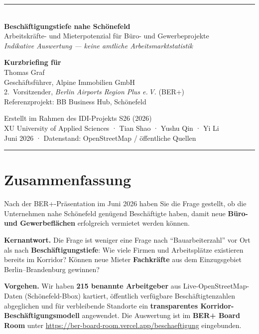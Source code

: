 \documentclass[11pt,a4paper,ngerman]{scrartcl}
\newcommand{\berhub}{\textbf{BER+ Board Room}}
\newcommand{\indikativ}{\textit{Indikative Auswertung — keine amtliche Arbeitsmarktstatistik}}
\begin{document}
\begin{titlepage}
  \centering
  \vspace*{1.2cm}
  {\color{berblue}\rule{\linewidth}{1.2pt}}\\[0.8em]
  {\LARGE\bfseries Beschäftigungstiefe nahe Schönefeld}\\[0.35em]
  {\large Arbeitskräfte- und Mieterpotenzial für Büro- und Gewerbeprojekte}\\[1.2em]
  {\normalsize\indikativ}\\[2em]

  \begin{minipage}{0.82\linewidth}
    \centering
    {\large\textbf{Kurzbriefing für}}\\[0.4em]
    {\Large Thomas Graf}\\[0.2em]
    {\normalsize Geschäftsführer, Alpine Immobilien GmbH\\
    2.\ Vorsitzender, \textit{Berlin Airports Region Plus e.\,V.} (BER+)\\
    Referenzprojekt: BB Business Hub, Schönefeld}
  \end{minipage}

  \vfill
  {\normalsize Erstellt im Rahmen des IDI-Projekts S26 (2026)}\\[0.3em]
  {\small XU University of Applied Sciences · Tian Shao · Yushu Qin · Yi Li}\\[0.8em]
  {\small Juni 2026 · Datenstand: OpenStreetMap / öffentliche Quellen}\\[0.5em]
  {\color{berblue}\rule{\linewidth}{1.2pt}}
\end{titlepage}

\thispagestyle{empty}
\section*{Zusammenfassung}

Nach der BER+-Präsentation im Juni 2026 haben Sie die Frage gestellt, ob die Unternehmen nahe Schönefeld genügend Beschäftigte haben, damit neue \textbf{Büro- und Gewerbeflächen} erfolgreich vermietet werden können.

\textbf{Kernantwort.} Die Frage ist weniger eine Frage nach \enquote{Bauarbeiterzahl} vor Ort als nach \textbf{Beschäftigungstiefe}: Wie viele Firmen und Arbeitsplätze existieren bereits im Korridor? Können neue Mieter \textbf{Fachkräfte} aus dem Einzugsgebiet Berlin–Brandenburg gewinnen?

\textbf{Vorgehen.} Wir haben \textbf{215 benannte Arbeitgeber} aus Live-OpenStreetMap-Daten (Schönefeld-Bbox) kartiert, öffentlich verfügbare Beschäftigtenzahlen abgeglichen und für verbleibende Standorte ein \textbf{transparentes Korridor-Beschäftigungsmodell} angewendet. Die Auswertung ist im \berhub{} unter \url{https://ber-board-room.vercel.app/beschaeftigung} eingebunden.
\end{document}
